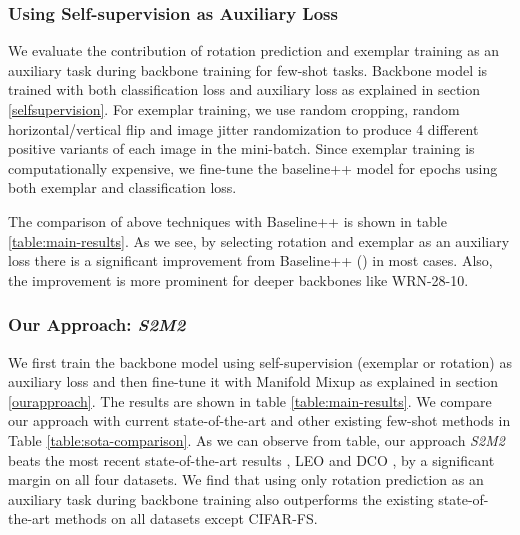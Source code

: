 \documentclass[10pt,twocolumn,letterpaper]{article}
\begin{document}
\subsubsection{Using Self-supervision as Auxiliary Loss}
We evaluate the contribution of rotation prediction \cite{Spyros2018rotate} and exemplar training \cite{exemplar2014} as an auxiliary task during backbone training for few-shot tasks. Backbone model is trained with both classification loss and auxiliary loss as explained in section \ref{selfsupervision}. For exemplar training, we use random cropping, random horizontal/vertical flip and image jitter randomization \cite{s4l2019} to produce 4 different positive variants of each image in the mini-batch. Since exemplar training is computationally expensive, we fine-tune the baseline++ model for  epochs using both exemplar and classification loss.

The comparison of above techniques with Baseline++ is shown in table
\ref{table:main-results}. As we see, by selecting rotation and exemplar as an auxiliary loss there is a significant improvement from Baseline++ () in most cases. Also, the improvement is more prominent for deeper backbones like WRN-28-10.

\vspace{-3pt}
\subsubsection{Our Approach: \textit{S2M2}}\label{results}
We first train the backbone model using self-supervision (exemplar or rotation) as auxiliary loss and then fine-tune it with Manifold Mixup as explained in section \ref{ourapproach}.
The results are shown in table \ref{table:main-results}. We compare our approach with current state-of-the-art \cite{leo2019, dco2019} and other existing few-shot methods \cite{snell2017prototypical, relation2017Sung} in Table \ref{table:sota-comparison}. As we can observe from table, our approach \textit{S2M2} beats the most recent state-of-the-art results , LEO \cite{leo2019} and DCO \cite{dco2019}, by a significant margin on all four datasets. We find that using only rotation prediction as an auxiliary task during backbone training also outperforms the existing state-of-the-art methods on all datasets except CIFAR-FS.
\end{document}
